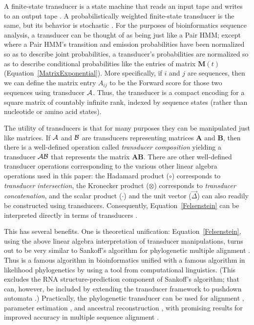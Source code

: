 \documentclass{bmcart}
\newcommand{\matr}[1]{\mathbf{#1}}
\newcommand{\trans}[1]{{\cal #1}}
\newcommand{\eqref}[1]{Equation~\ref{#1}}
\newcommand{\condmatrix}{\matr{M}}
\newcommand{\unitvec}{\vec{\Delta}}
\newcommand{\pointprod}{\circ}
\newcommand{\scalarprod}{\cdot}
\begin{document}
A finite-state transducer is a state machine that reads an input tape and writes to an output tape \cite{Mealy55}.
A probabilistically weighted finite-state transducer is the same, but its behavior is stochastic \cite{MohriPereiraRiley2000}.
For the purposes of bioinformatics sequence analysis,
a transducer can be thought of as being just like a Pair HMM;
except where a Pair HMM's transition and emission probabilities
have been normalized so as to describe joint probabilities,
a transducer's probabilities are normalized so as to describe conditional probabilities
like the entries of matrix $\condmatrix(t)$ (\eqref{MatrixExponential}).
More specifically, if $i$ and $j$ are sequences, then we can define the matrix entry $A_{ij}$
to be the Forward score for those two sequences using transducer $\trans{A}$.
Thus, the transducer is a compact encoding for a square matrix of countably infinite rank,
indexed by sequence states (rather than nucleotide or amino acid states).

The utility of transducers is that for many purposes they can be manipulated just like matrices.
If $\trans{A}$ and $\trans{B}$ are transducers representing matrices $\matr{A}$ and $\matr{B}$,
then there is a well-defined operation called {\em transducer composition}
yielding a transducer $\trans{A}\trans{B}$ that represents the matrix $\matr{A}\matr{B}$.
There are other well-defined transducer operations corresponding to the various other linear algebra
operations used in this paper:
the Hadamard product ($\pointprod$) corresponds to {\em transducer intersection},
the Kronecker product ($\otimes$) corresponds to {\em transducer concatenation},
and the scalar product ($\scalarprod$) and the unit vector ($\unitvec$) can also readily be constructed using transducers.
Consequently, \eqref{Felsenstein} can be interpreted directly
in terms of transducers \cite{WestessonEtAlArxiv2011,WestessonEtAl2012,BouchardCote2013}.

This has several benefits.
One is theoretical unification: \eqref{Felsenstein}, using the above
linear algebra interpretation of transducer manipulations,
turns out to be very similar to Sankoff's algorithm for phylogenetic multiple alignment \cite{Sankoff85}.
Thus is a famous algorithm in bioinformatics unified with a famous algorithm in likelihood phylogenetics
by using a tool from computational linguistics.
(This excludes the RNA structure-prediction component of Sankoff's algorithm;
that can, however, be included by extending the transducer
framework to pushdown automata \cite{BradleyHolmes2009}.)
Practically, the phylogenetic transducer can be used for alignment \cite{RedelingsSuchard2005,RedelingsSuchard2007},
parameter estimation \cite{Redelings2014}, and ancestral reconstruction \cite{WestessonEtAl2012},
with promising results for improved accuracy in multiple sequence alignment \cite{IndelHistorian}.
\end{document}
